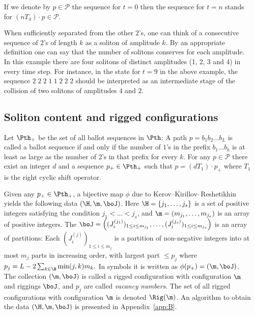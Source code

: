 If we denote by $p \in {\mathcal P}$ the sequence for $t=0$ then the sequence for $t=n$ stands for
$(n T_4) \cdot p \in {\mathcal P}$.

When suf\/f\/iciently separated from the other $2$'s, one can think of
a consecutive sequence of $2$'s of length $k$ as a soliton of amplitude $k$.
By an appropriate def\/inition one can say that the number of solitons conserves for each amplitude.
In this example there are four solitons of distinct amplitudes (1, 2, 3 and 4) in every time step.
For instance, in the state for $t=9$ in the above example, the sequence $2\; 2\; 2\; 1\; 1\; 2\; 2\; 2$ should be interpreted as
an intermediate stage of the collision of two solitons of amplitudes $4$ and $2$.


\subsection{Soliton content and rigged conf\/igurations}\label{subsec:4_2}

Let
$\Pth_+$ be the set of all ballot sequences in $\Pth $: A path $p = b_1 b_2 \ldots b_L$ is called a ballot sequence if and only if
the number of $1$'s in the pref\/ix $b_1 \ldots b_k$ is at least as large as the number of $2$'s in that pref\/ix
for every $k$.
%
For any $p \in {\mathcal P}$ there exist an integer $d$ and a sequence $p_+ \in \Pth_+$ such that $p = (d T_1) \cdot p_+$
where $T_1$ is the right cyclic shift operator.

Given any $p_+ \in \Pth_+$, a bijective map $\phi$
due to Kerov--Kirillov--Reshetikhin \cite{KKR,KR}
yields the following data
$(\H, \m, \boJ)$.
Here $\H=\{ j_1,  \ldots ,j_s \}$ is a set of positive integers
satisfying the condition $j_1 < \dots < j_s$, and
$\m=( m_{j_1},\ldots,m_{j_s} )$ is an array of positive integers.
The
$\boJ = \left((J^{(j_1)}_i)_{1 \le i \le m_{j_1}}, \ldots,
(J^{(j_s)}_i)_{1 \le i \le m_{j_s}}\right)$
is an array of partitions:
Each $(J^{(j)}_i)_{1 \le i \le m_{j}}$ is a partition of non-negative integers into at most $m_j$ parts
in increasing order,
with largest part $\le p_j$
where
\begin{math}%
p_j = L - 2\sum_{k \in \H}\min(j,k)m_k.
\end{math}
In symbols it is written as $\phi (p_+) = (\m,\boJ)$.
The collection $(\m,\boJ)$ is called a rigged conf\/iguration with conf\/iguration $\m$ and
riggings $\boJ$, and $p_j$ are called \textit{vacancy numbers}.
The set of all rigged conf\/igurations with conf\/iguration $\m$ is denoted $\Rig(\m)$.
An algorithm to obtain the data
$(\H, \m, \boJ)$ is presented in Appendix~\ref{app:B}.

